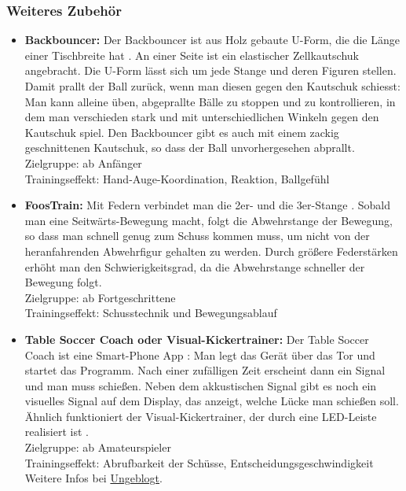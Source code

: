 \subsubsection{Weiteres Zubehör}
\label{tisch:zubehoer:training:weiteres}

\begin{itemize}
\item {\normalfont \bfseries Backbouncer:}
Der Backbouncer ist aus Holz gebaute U-Form, die die Länge einer Tischbreite hat \citep{www:kickertrainer}.
An einer Seite ist ein elastischer Zellkautschuk angebracht.
Die U-Form lässt sich um jede Stange und deren Figuren stellen. 
Damit prallt der Ball zurück, wenn man diesen gegen den Kautschuk schiesst: 
Man kann alleine üben, abgeprallte Bälle zu stoppen und zu kontrollieren, in dem man verschieden stark und mit unterschiedlichen Winkeln gegen den Kautschuk spiel. 
Den Backbouncer gibt es auch mit einem zackig geschnittenen Kautschuk, so dass der Ball unvorhergesehen abprallt.  
\\
Zielgruppe: ab Anfänger 
\\
Trainingseffekt: Hand-Auge-Koordination, Reaktion, Ballgefühl
\item {\normalfont \bfseries FoosTrain:}
Mit Federn verbindet man die 2er- und die 3er-Stange \citep{www:foostrain}.
Sobald man eine Seitwärts-Bewegung macht, folgt die Abwehrstange der Bewegung, so dass man schnell genug zum Schuss kommen muss, um nicht von der heranfahrenden Abwehrfigur gehalten zu werden.
Durch größere Federstärken erhöht man den Schwierigkeitsgrad, da die Abwehrstange schneller der Bewegung folgt.
\\
Zielgruppe: ab Fortgeschrittene
\\
Trainingseffekt: Schusstechnik und Bewegungsablauf 
\item {\normalfont \bfseries Table Soccer Coach oder Visual-Kickertrainer:}
Der Table Soccer Coach ist eine Smart-Phone App \citep{www:tablesoccercoach}:
Man legt das Gerät über das Tor und startet das Programm. 
Nach einer zufälligen Zeit erscheint dann ein Signal und man muss schießen.
Neben dem akkustischen Signal gibt es noch ein visuelles Signal auf dem Display, das anzeigt, welche Lücke man schießen soll.
Ähnlich funktioniert der Visual-Kickertrainer, der durch eine LED-Leiste realisiert ist \citep{www:visualkickertrainer}.
\\
Zielgruppe: ab Amateurspieler 
\\
Trainingseffekt: Abrufbarkeit der Schüsse, Entscheidungsgeschwindigkeit
\\
Weitere Infos bei \href{http://ungeblogtkickern.blogspot.de/2015/01/table-soccer-coach.html}{Ungeblogt}.


\end{itemize}
